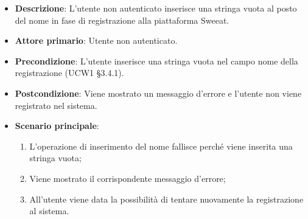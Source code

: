 \begin{itemize}
\item \textbf{Descrizione}: L'utente non autenticato inserisce una stringa vuota al posto del nome in fase di registrazione alla piattaforma Sweeat.
\item \textbf{Attore primario}: Utente non autenticato.
\item \textbf{Precondizione}: L'utente inserisce una stringa vuota nel campo nome della registrazione (UCW1 §3.4.1).
\item \textbf{Postcondizione}: Viene mostrato un messaggio d'errore e l'utente non viene registrato nel sistema.

\item \textbf{Scenario principale}:
\begin{enumerate}
\item L'operazione di inserimento del nome fallisce perché viene inserita una stringa vuota;
\item Viene mostrato il corrispondente messaggio d'errore;
\item All'utente viene data la possibilità di tentare nuovamente la registrazione al sistema.
\end{enumerate}
\end{itemize}
